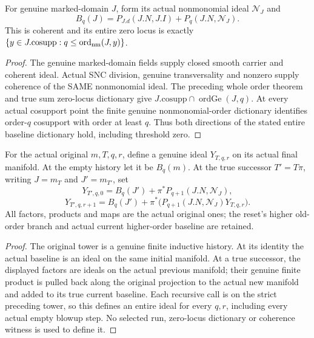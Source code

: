 \begin{lemma}
\label{hir:original-global-companion-year-baseline-coherent-ideal}
\leanok
{}
For genuine marked-domain $J$, form its actual nonmonomial ideal $\mathcal N_J$
and
\[
 B_q(J)=P_{J.d}(J.N,J.I)+P_q(J.N,\mathcal N_J).
\]
This is coherent and its entire zero locus is exactly
$\{y\in J.\mathrm{cosupp}:q\leq\operatorname{ord}_{\rm nm}(J,y)\}$.
\end{lemma}
\begin{proof}
The genuine marked-domain fields supply closed smooth carrier and coherent
ideal. Actual SNC division, genuine transversality and nonzero supply coherence
of the SAME nonmonomial ideal. The preceding whole order theorem and true sum
zero-locus dictionary give $J.\mathrm{cosupp}\cap\operatorname{ordGe}(J,q)$.
At every actual cosupport point the finite genuine nonmonomial-order dictionary
identifies order-$q$ cosupport with order at least $q$. Thus both directions
of the stated entire baseline dictionary hold, including threshold zero.
\end{proof}

\begin{definition}
\label{hir:original-global-companion-history-year-ideal-recursion}
\leanok
{}
For the actual original $m,T,q,r$, define a genuine ideal $Y_{T,q,r}$ on its
actual final manifold. At the empty history let it be $B_q(m)$. At the true
successor $T'=T\pi$, writing $J=m_T$ and $J'=m_{T'}$, set
\[
 Y_{T',q,0}=B_q(J')+\pi^*P_{q+1}(J.N,\mathcal N_J),
\]
\[
 Y_{T',q,r+1}=B_q(J')+
 \pi^*\bigl(P_{q+1}(J.N,\mathcal N_J)Y_{T,q,r}\bigr).
\]
All factors, products and maps are the actual original ones; the reset's higher
old-order branch and actual current higher-order baseline are retained.
\end{definition}
\begin{proof}
The original tower is a genuine finite inductive history. At its identity
the actual baseline is an ideal on the same initial manifold. At a true
successor, the displayed factors are ideals on the actual previous manifold;
their genuine finite product is pulled back along the original projection
to the actual new manifold and added to its true current baseline. Each
recursive call is on the strict preceding tower, so this defines an entire
ideal for every $q,r$, including every actual empty blowup step. No selected
run, zero-locus dictionary or coherence witness is used to define it.
\end{proof}

